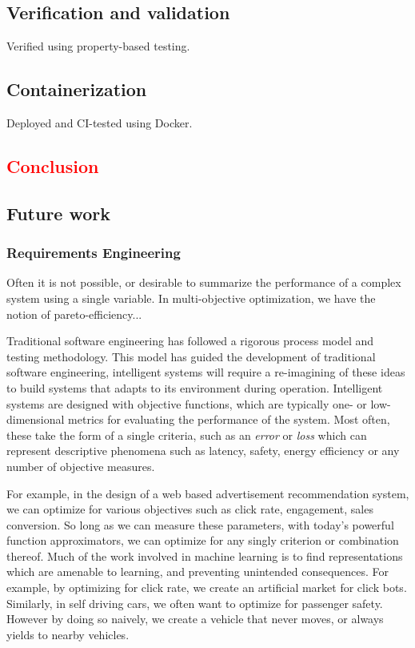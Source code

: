 \documentclass[12pt,initial,twoside,maitrise]{dms}
\newcommand{\rare}[1]{\textcolor{red}{#1}}
\numberwithin{equation}{section}
\numberwithin{table}{chapter}
\numberwithin{figure}{chapter}
\begin{document}
\section{Verification and validation}

Verified using property-based testing.

\section{Containerization}

Deployed and CI-tested using Docker.

\rare{\chapter{Conclusion}\label{ch:conclusion}}

\section{Future work}

\subsection{Requirements Engineering}

Often it is not possible, or desirable to summarize the performance of a complex system using a single variable. In multi-objective optimization, we have the notion of pareto-efficiency...

Traditional software engineering has followed a rigorous process model and testing methodology. This model has guided the development of traditional software engineering, intelligent systems will require a re-imagining of these ideas to build systems that adapts to its environment during operation. Intelligent systems are designed with objective functions, which are typically one- or low-dimensional metrics for evaluating the performance of the system. Most often, these take the form of a single criteria, such as an \textit{error} or \textit{loss} which can represent descriptive phenomena such as latency, safety, energy efficiency or any number of objective measures.

For example, in the design of a web based advertisement recommendation system, we can optimize for various objectives such as click rate, engagement, sales conversion. So long as we can measure these parameters, with today's powerful function approximators, we can optimize for any singly criterion or combination thereof. Much of the work involved in machine learning is to find representations which are amenable to learning, and preventing unintended consequences. For example, by optimizing for click rate, we create an artificial market for click bots. Similarly, in self driving cars, we often want to optimize for passenger safety. However by doing so naively, we create a vehicle that never moves, or always yields to nearby vehicles.
\end{document}
